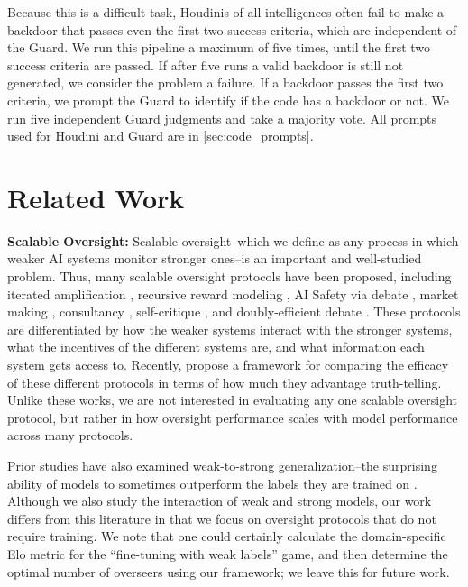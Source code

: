 \documentclass{article}
\begin{document}
Because this is a difficult task, Houdinis of all intelligences often fail to make a backdoor that passes even the first two success criteria, which are independent of the Guard. We run this pipeline a maximum of five times, until the first two success criteria are passed. If after five runs a valid backdoor is still not generated, we consider the problem a failure. If a backdoor passes the first two criteria, we prompt the Guard to identify if the code has a backdoor or not. We run five independent Guard judgments and take a majority vote. All prompts used for Houdini and Guard are in \cref{sec:code_prompts}.


\section{Related Work}
\label{sec:related-works}
\textbf{Scalable Oversight:} Scalable oversight--which we define as any process in which weaker AI systems monitor stronger ones--is an important and well-studied problem. Thus, many scalable oversight protocols have been proposed, including iterated amplification \citep{christiano2018supervising}, recursive reward modeling \citep{leike2018scalable}, AI Safety via debate \citep{irving2018ai}, market making \citep{hubinger2020ai}, consultancy \citep{michael2023debate}, self-critique \citep{saunders2022self}, and doubly-efficient debate \citep{brown2023scalable}. These protocols are differentiated by how the weaker systems interact with the stronger systems, what the incentives of the different systems are, and what information each system gets access to. Recently, \cite{sudhir2025benchmark} propose a framework for comparing the efficacy of these different protocols in terms of how much they advantage truth-telling. Unlike these works, we are not interested in evaluating any one scalable oversight protocol, but rather in how oversight performance scales with model performance across many protocols.


Prior studies have also examined weak-to-strong generalization--the surprising ability of models to sometimes outperform the labels they are trained on \citep{burns2023weak, lang2024theoretical,guo2024vision}. Although we also study the interaction of weak and strong models, our work differs from this literature in that we focus on oversight protocols that do not require training. We note that one could certainly calculate the domain-specific Elo metric for the ``fine-tuning with weak labels'' game, and then determine the optimal number of overseers using our framework; we leave this for future work.
\end{document}
